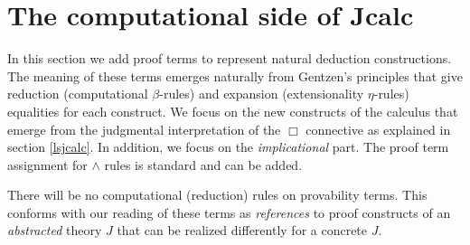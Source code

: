\chapter{The computational side of Jcalc }
\label{jcalccom}
In this section we add proof terms to represent natural deduction constructions. 
The  meaning of these terms emerges naturally from Gentzen's principles that give reduction 
(computational $\beta$-rules) and expansion (extensionality $\eta$-rules) equalities for 
 each construct. We focus on the new constructs of the calculus that emerge from the judgmental interpretation of the $\Box$ connective as explained in 
section \ref{lsjcalc}. In addition, we focus on the \textit{implicational} part. The proof term assignment
for $\wedge$ rules is standard and can be added.

There will be no computational (reduction) rules on  provability terms. 
This conforms with our reading of these terms  as \textit{references} to proof constructs of an \textit{abstracted} theory $J$ that can be realized 
differently for a concrete $J$.  
